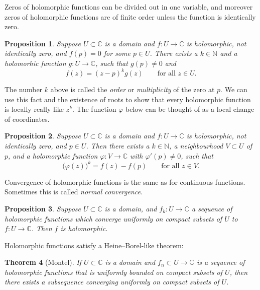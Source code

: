 \documentclass[12pt,openany]{book}
\newcommand{\C}{{\mathbb{C}}}
\newcommand{\N}{{\mathbb{N}}}
\newcommand{\myindex}[1]{#1\index{#1}}
\theoremstyle{plain}
\newtheorem{thm}{Theorem}[section]
\newtheorem{prop}[thm]{Proposition}
\theoremstyle{remark}
\theoremstyle{definition}
\theoremstyle{exercise}
\theoremstyle{example}
\begin{document}
Zeros of holomorphic functions
can be divided out in one variable, and moreover zeros
of holomorphic functions are of finite order unless
the function is identically zero.

\begin{prop}
Suppose $U \subset \C$ is a domain and
$f \colon U \to \C$ is holomorphic, not identically zero, and $f(p) = 0$
for some $p \in U$.  There exists a $k \in \N$ and
a holomorhic function $g \colon U \to \C$,
such that $g(p) \not= 0$ and
\begin{equation*}
f(z) = {(z-p)}^k g(z) \qquad \text{for all $z \in U$.}
\end{equation*}
\end{prop}

The number $k$ above is called the \emph{order}
or \emph{multiplicity}
of the zero at $p$.
We can use this fact and the existence of roots to show that every
holomorphic function is locally really like $z^k$.  The function $\varphi$
below can be thought of as a local change of coordinates.

\begin{prop}
Suppose $U \subset \C$ is a domain and
$f \colon U \to \C$ is holomorphic, not identically zero, and $p \in U$.
Then there exists a $k \in \N$,
a neighbourhood $V \subset U$ of $p$,  and
a holomorphic function $\varphi \colon V \to \C$ with 
$\varphi'(p) \not= 0$, such that
\begin{equation*}
{\bigl(\varphi(z)\bigr)}^k = f(z) - f(p)
\qquad \text{for all $z \in V$.}
\end{equation*}
\end{prop}

Convergence of holomorphic functions is the same as for continuous
functions.  Sometimes this is called \emph{\myindex{normal convergence}}.

\begin{prop}
Suppose $U \subset \C$ is a domain, and $f_k \colon U \to \C$
a sequence of holomorphic functions which converge uniformly
on compact subsets of $U$ to $f \colon U \to \C$.  Then $f$ is holomorphic.
\end{prop}

Holomorphic functions satisfy a Heine--Borel-like theorem:

\begin{thm}[Montel]
If $U \subset \C$ is a domain and
$f_n \subset U \to \C$ is a sequence of holomorphic functions
that is uniformly bounded on compact subsets of $U$,
then there exists a subsequence converging uniformly on compact subsets
of $U$.
\end{thm}
\end{document}
